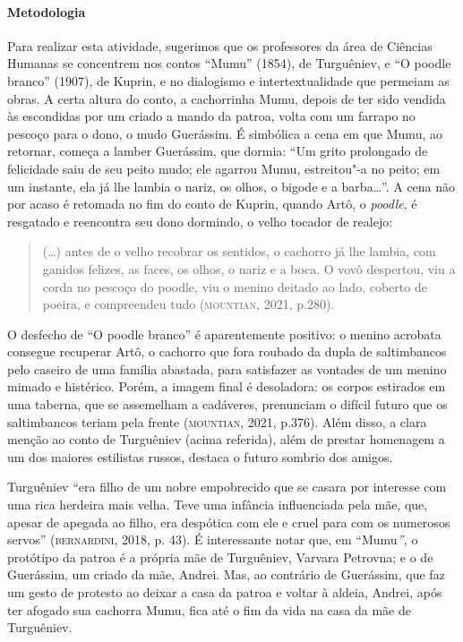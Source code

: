 \documentclass[11pt]{extarticle}
\begin{document}
\paragraph{Metodologia}
Para realizar esta atividade, sugerimos que os professores da área de Ciências Humanas se concentrem nos
contos ``Mumu'' (1854), de Turguêniev, e ``O poodle branco''
(1907), de Kuprin, e no dialogismo e intertextualidade que permeiam as
obras. A certa altura do conto, a cachorrinha Mumu, depois de ter sido
vendida às escondidas por um criado a mando da patroa, volta com um farrapo no pescoço para o
dono, o mudo Guerássim. É simbólica a cena em
que Mumu, ao retornar, começa a lamber Guerássim, que dormia: ``Um grito
prolongado de felicidade saiu de seu peito mudo; ele agarrou Mumu,
estreitou"-a no peito; em um instante, ela já lhe lambia o nariz, os
olhos, o bigode e a barba\ldots{}''. A cena não por acaso é retomada no fim
do conto de Kuprin, quando Artô, o \emph{poodle}, é resgatado e
reencontra seu dono dormindo, o velho tocador de realejo:

\begin{quote}
(\ldots{}) antes de o velho recobrar os sentidos, o cachorro já lhe lambia, com
ganidos felizes, as faces, os olhos, o nariz e a boca. O vovô despertou,
viu a corda no pescoço do poodle, viu o menino deitado ao lado, coberto
de poeira, e compreendeu tudo (\textsc{mountian}, 2021, p.280).
\end{quote}


O desfecho de ``O poodle branco'' é aparentemente positivo: o menino
acrobata consegue recuperar Artô, o cachorro que fora roubado da dupla
de saltimbancos pelo caseiro de uma família abastada, para satisfazer as
vontades de um menino mimado e histérico. Porém, a imagem final é
desoladora: os corpos estirados em uma taberna, que se assemelham a
cadáveres, prenunciam o difícil futuro que os saltimbancos teriam pela
frente (\textsc{mountian}, 2021, p.376). Além disso, a clara menção ao conto de
Turguêniev (acima referida), além de prestar homenagem a um dos maiores
estilistas russos, destaca o futuro sombrio dos amigos.

Turguêniev ``era filho de um nobre empobrecido que se casara por
interesse com uma rica herdeira mais velha. Teve uma infância
influenciada pela mãe, que, apesar de apegada ao filho, era despótica
com ele e cruel para com os numerosos servos'' (\textsc{bernardini}, 2018, p.
43). É interessante notar que, em ``Mumu\emph{'',} o protótipo da patroa
é a própria mãe de Turguêniev, Varvara Petrovna; e o de Guerássim, um
criado da mãe, Andrei. Mas, ao contrário de Guerássim, que faz um gesto
de protesto ao deixar a casa da patroa e voltar à aldeia, Andrei, após
ter afogado sua cachorra Mumu, fica até o fim da vida na casa da mãe de
Turguêniev.
\end{document}
